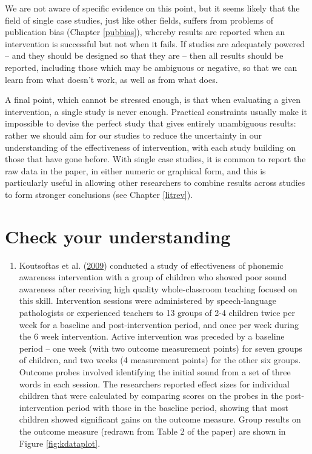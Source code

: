 \documentclass{krantz}
\providecommand{\tightlist}{%
\setlength{\itemsep}{0pt}\setlength{\parskip}{0pt}}
\begin{document}
We are not aware of specific evidence on this point, but it seems likely that the field of single case studies, just like other fields, suffers from problems of publication bias (Chapter \ref{pubbias}), whereby results are reported when an intervention is successful but not when it fails. If studies are adequately powered -- and they should be designed so that they are -- then all results should be reported, including those which may be ambiguous or negative, so that we can learn from what doesn't work, as well as from what does.

A final point, which cannot be stressed enough, is that when evaluating a given intervention, a single study is never enough. Practical constraints usually make it impossible to devise the perfect study that gives entirely unambiguous results: rather we should aim for our studies to reduce the uncertainty in our understanding of the effectiveness of intervention, with each study building on those that have gone before. With single case studies, it is common to report the raw data in the paper, in either numeric or graphical form, and this is particularly useful in allowing other researchers to combine results across studies to form stronger conclusions (see Chapter \ref{litrev}).

\hypertarget{check-your-understanding-19}{%
\section{Check your understanding}\label{check-your-understanding-19}}

\begin{enumerate}
\def\labelenumi{\arabic{enumi}.}
\tightlist
\item
  Koutsoftas et al. (\protect\hyperlink{ref-koutsoftas2009}{2009}) conducted a study of effectiveness of phonemic awareness intervention with a group of children who showed poor sound awareness after receiving high quality whole-classroom teaching focused on this skill. Intervention sessions were administered by speech-language pathologists or experienced teachers to 13 groups of 2-4 children twice per week for a baseline and post-intervention period, and once per week during the 6 week intervention. Active intervention was preceded by a baseline period -- one week (with two outcome measurement points) for seven groups of children, and two weeks (4 measurement points) for the other six groups. Outcome probes involved identifying the initial sound from a set of three words in each session. The researchers reported effect sizes for individual children that were calculated by comparing scores on the probes in the post-intervention period with those in the baseline period, showing that most children showed significant gains on the outcome measure. Group results on the outcome measure (redrawn from Table 2 of the paper) are shown in Figure \ref{fig:kdataplot}.
\end{enumerate}
\end{document}
